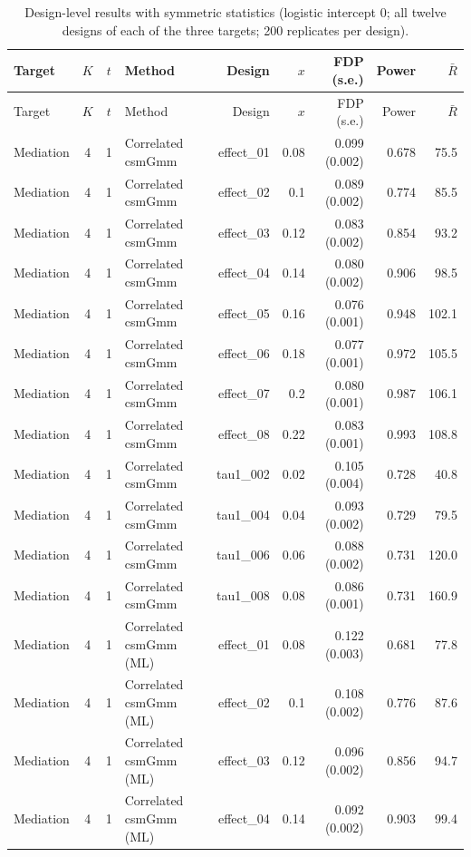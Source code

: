 \begin{longtable}{lcclrrrrr}
\caption{Design-level results with symmetric statistics (logistic intercept 0; all twelve designs of each of the three targets; 200 replicates per design).}\label{tab:sim-sym}\\
\toprule
Target & $K$ & $t$ & Method & Design & $x$ & FDP (s.e.) & Power & $\bar R$\\
\midrule
\endfirsthead
\toprule
Target & $K$ & $t$ & Method & Design & $x$ & FDP (s.e.) & Power & $\bar R$\\
\midrule
\endhead
Mediation & 4 & 1 & Correlated csmGmm & effect\_01 & 0.08 & 0.099 (0.002) & 0.678 & 75.5\\
Mediation & 4 & 1 & Correlated csmGmm & effect\_02 & 0.1 & 0.089 (0.002) & 0.774 & 85.5\\
Mediation & 4 & 1 & Correlated csmGmm & effect\_03 & 0.12 & 0.083 (0.002) & 0.854 & 93.2\\
Mediation & 4 & 1 & Correlated csmGmm & effect\_04 & 0.14 & 0.080 (0.002) & 0.906 & 98.5\\
Mediation & 4 & 1 & Correlated csmGmm & effect\_05 & 0.16 & 0.076 (0.001) & 0.948 & 102.1\\
Mediation & 4 & 1 & Correlated csmGmm & effect\_06 & 0.18 & 0.077 (0.001) & 0.972 & 105.5\\
Mediation & 4 & 1 & Correlated csmGmm & effect\_07 & 0.2 & 0.080 (0.001) & 0.987 & 106.1\\
Mediation & 4 & 1 & Correlated csmGmm & effect\_08 & 0.22 & 0.083 (0.001) & 0.993 & 108.8\\
Mediation & 4 & 1 & Correlated csmGmm & tau1\_002 & 0.02 & 0.105 (0.004) & 0.728 & 40.8\\
Mediation & 4 & 1 & Correlated csmGmm & tau1\_004 & 0.04 & 0.093 (0.002) & 0.729 & 79.5\\
Mediation & 4 & 1 & Correlated csmGmm & tau1\_006 & 0.06 & 0.088 (0.002) & 0.731 & 120.0\\
Mediation & 4 & 1 & Correlated csmGmm & tau1\_008 & 0.08 & 0.086 (0.001) & 0.731 & 160.9\\
Mediation & 4 & 1 & Correlated csmGmm (ML) & effect\_01 & 0.08 & 0.122 (0.003) & 0.681 & 77.8\\
Mediation & 4 & 1 & Correlated csmGmm (ML) & effect\_02 & 0.1 & 0.108 (0.002) & 0.776 & 87.6\\
Mediation & 4 & 1 & Correlated csmGmm (ML) & effect\_03 & 0.12 & 0.096 (0.002) & 0.856 & 94.7\\
Mediation & 4 & 1 & Correlated csmGmm (ML) & effect\_04 & 0.14 & 0.092 (0.002) & 0.903 & 99.4\\

\end{longtable}
